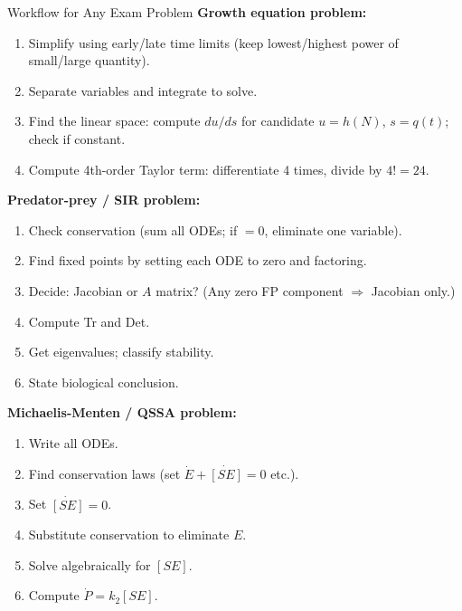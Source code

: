 \documentclass[10pt]{article}
\begin{document}
\begin{rulebox}{Workflow for Any Exam Problem}
\textbf{Growth equation problem:}
\begin{enumerate}
  \item Simplify using early/late time limits (keep lowest/highest power of small/large quantity).
  \item Separate variables and integrate to solve.
  \item Find the linear space: compute $du/ds$ for candidate $u = h(N)$, $s = q(t)$; check if constant.
  \item Compute 4th-order Taylor term: differentiate 4 times, divide by $4! = 24$.
\end{enumerate}

\textbf{Predator-prey / SIR problem:}
\begin{enumerate}
  \item Check conservation (sum all ODEs; if $= 0$, eliminate one variable).
  \item Find fixed points by setting each ODE to zero and factoring.
  \item Decide: Jacobian or $A$ matrix? (Any zero FP component $\Rightarrow$ Jacobian only.)
  \item Compute Tr and Det.
  \item Get eigenvalues; classify stability.
  \item State biological conclusion.
\end{enumerate}

\textbf{Michaelis-Menten / QSSA problem:}
\begin{enumerate}
  \item Write all ODEs.
  \item Find conservation laws (set $\dot E + \dot{[SE]} = 0$ etc.).
  \item Set $\dot{[SE]} = 0$.
  \item Substitute conservation to eliminate $E$.
  \item Solve algebraically for $[SE]$.
  \item Compute $\dot P = k_2[SE]$.
\end{enumerate}
\end{rulebox}
\end{document}
